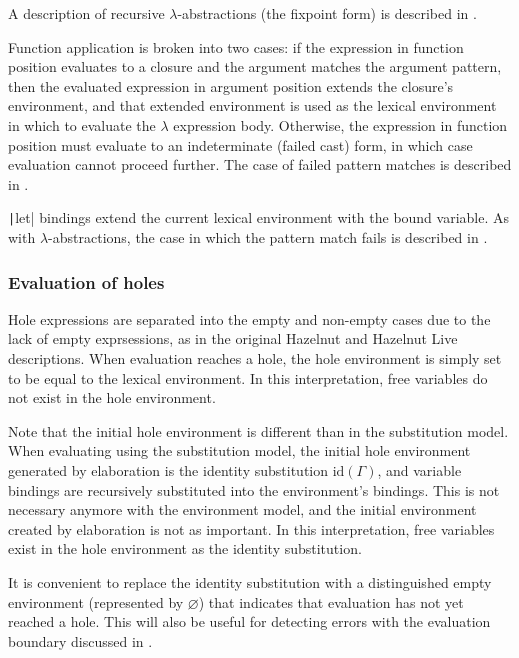 A description of recursive $\lambda$-abstractions (the fixpoint form) is described in .

Function application is broken into two cases: if the expression in function position evaluates to a closure and the argument matches the argument pattern, then the evaluated expression in argument position extends the closure's environment, and that extended environment is used as the lexical environment in which to evaluate the $\lambda$ expression body. Otherwise, the expression in function position must evaluate to an indeterminate (failed cast) form, in which case evaluation cannot proceed further. The case of failed pattern matches is described in .


\texttt|let| bindings extend the current lexical environment with the bound variable. As with $\lambda$-abstractions, the case in which the pattern match fails is described in .

\subsubsection{Evaluation of holes}
\label{sec:holeenv_evalenv_connection}

Hole expressions are separated into the empty and non-empty cases due to the lack of empty exprsessions, as in the original Hazelnut and Hazelnut Live descriptions. When evaluation reaches a hole, the hole environment is simply set to be equal to the lexical environment. In this interpretation, free variables do not exist in the hole environment.

Note that the initial hole environment is different than in the substitution model. When evaluating using the substitution model, the initial hole environment generated by elaboration is the identity substitution $\text{id}({\Gamma})$, and variable bindings are recursively substituted into the environment's bindings. This is not necessary anymore with the environment model, and the initial environment created by elaboration is not as important. In this interpretation, free variables exist in the hole environment as the identity substitution.

It is convenient to replace the identity substitution with a distinguished empty environment (represented by $\varnothing$) that indicates that evaluation has not yet reached a hole. This will also be useful for detecting errors with the evaluation boundary discussed in .

